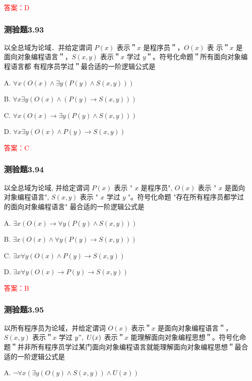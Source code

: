 \documentclass[UTF8, heading=true]{ctexart}
\begin{document}
\textcolor{red}{答案：D}

\subsubsection{测验题3.93}

以全总域为论域．并给定谓词 $P(x)$ 表示＂$x$ 是程序员＂，$O(x)$ 表
示＂$x$ 是面向对象编程语言＂，$S(x, y)$ 表示＂$x$ 学过 $y$＂。符号化命题＂所有面向对象编程语言都
有程序员学过＂最合适的一阶逻辑公式是 $\qquad$

A. $\forall x(O(x) \wedge \exists y(P(y) \wedge S(x, y)))$

B. $\forall x \exists y(O(x) \wedge(P(y) \rightarrow S(x, y)))$

C. $\forall x(O(x) \rightarrow \exists y(P(y) \wedge S(x, y)))$

D. $\forall x \exists y(O(x) \wedge P(y) \rightarrow S(x, y))$

\textcolor{red}{答案：C}

\subsubsection{测验题3.94}

以全总域为论域, 并给定谓词 $P(x)$ 表示 " $x$ 是程序员", $O(x)$ 表示 " $x$ 是面向对象编程语言", $S(x, y)$ 表示 " $x$ 学过 $y$ "。符号化命题 "存在所有程序员都学过的面向对象编程语言" 最合适的一阶逻辑公式是 $\qquad$

A. $\exists x(O(x) \rightarrow \forall y(P(y) \wedge S(x, y)))$

B. $\exists x(O(x) \wedge \forall y(P(y) \rightarrow S(x, y)))$

C. $\exists x \forall y(O(x) \wedge P(y) \rightarrow S(x, y))$

D. $\exists x \forall y(O(x) \rightarrow P(y) \rightarrow S(x, y))$

\textcolor{red}{答案：B}


\subsubsection{测验题3.95}

以所有程序员为论域，并给定谓词 $O(x)$ 表示＂$x$ 是面向对象编程语言＂，$S(x, y)$ 表示＂$x$ 学过 $y ", ~ U(x)$ 表示＂$x$ 能理解面向对象编程思想＂。符号化命题＂并非所有程序员学过某门面向对象编程语言就能理解面向对象编程思想＂最合适的一阶逻辑公式是 $\qquad$

A. $
\neg \forall x(\exists y(O(y) \wedge S(x, y)) \wedge U(x))
$
\end{document}
